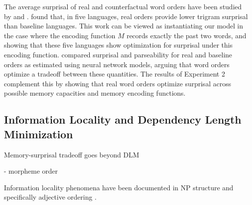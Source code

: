 The average surprisal of real and counterfactual word orders have been studied by \citet{gildea-human-2015} and \cite{hahn2020universals}.
\citet{gildea-human-2015} found that, in five languages, real orders provide lower trigram surprisal than baseline languages.
This work can be viewed as instantiating our model in the case where the encoding function $M$ records exactly the past two words, and showing that these five languages show optimization for surprisal under this encoding function.
\citet{hahn2020universals} compared surprisal and parseability for real and baseline orders as estimated using neural network models, arguing that word orders optimize a tradeoff between these quantities.
The results of Experiment 2 complement this by showing that real word orders optimize surprisal across possible memory capacities and memory encoding functions.


\subsection{Information Locality and Dependency Length Minimization}

Memory-surprisal tradeoff goes beyond DLM

- morpheme order

Information locality phenomena have been documented in NP structure \citep{kirby2018the} and specifically adjective ordering \citep{hahn-information-theoretic-2018, DBLP:conf/acl/FutrellDS20}.






